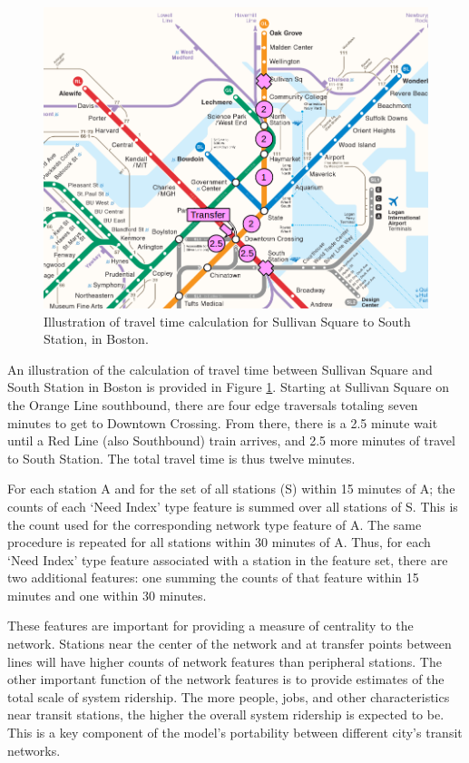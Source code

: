 \documentclass[11pt]{article}
\begin{document}
\begin{figure}
\begin{center}\includegraphics[scale=0.7]{transfer_demonstration}\end{center}\caption{Illustration of travel time calculation for Sullivan Square to South Station, in Boston.}\label{fig:f2}
\end{figure}

An illustration of the calculation of travel time between Sullivan Square and South Station in Boston is provided in Figure \ref{fig:f2}. Starting at Sullivan Square on the Orange Line southbound, there are four edge traversals totaling seven minutes to get to Downtown Crossing. From there, there is a 2.5 minute wait until a Red Line (also Southbound) train arrives, and 2.5 more minutes of travel to South Station. The total travel time is thus twelve minutes. 

For each station A and for the set of all stations (S) within 15 minutes of A; the counts of each `Need Index' type feature is summed over all stations of S. This is the count used for the corresponding network type feature of A. The same procedure is repeated for all stations within 30 minutes of A. Thus, for each `Need Index' type feature associated with a station in the feature set, there are two additional features: one summing the counts of that feature within 15 minutes and one within 30 minutes. 

These features are important for providing a measure of centrality to the network. Stations near the center of the network and at transfer points between lines will have higher counts of network features than peripheral stations. The other important function of the network features is to provide estimates of the total scale of system ridership. The more people, jobs, and other characteristics near transit stations, the higher the overall system ridership is expected to be. This is a key component of the model's portability between different city's transit networks. 
\end{document}

